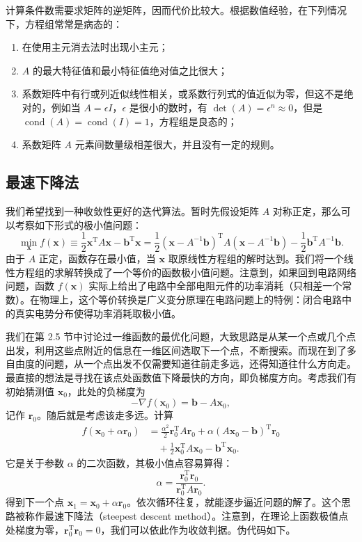 计算条件数需要求矩阵的逆矩阵，因而代价比较大。根据数值经验，在下列情况下，方程组常常是病态的：
\begin{enumerate}
\item 在使用主元消去法时出现小主元；
\item $A$ 的最大特征值和最小特征值绝对值之比很大；
\item 系数矩阵中有行或列近似线性相关，或系数行列式的值近似为零，但这不是绝对的，例如当 $A=\epsilon I$，$\epsilon$ 是很小的数时，有 $\det(A)=\epsilon^n\approx0$，但是 $\operatorname{cond}(A)=\operatorname{cond}(I)=1$，方程组是良态的；
\item 系数矩阵 $A$ 元素间数量级相差很大，并且没有一定的规则。
\end{enumerate}

\subsection{最速下降法}

我们希望找到一种收敛性更好的迭代算法。暂时先假设矩阵 $A$ 对称正定，那么可以考察如下形式的极小值问题：
\begin{equation}
\min_{\bm x} f(\bm x)\equiv\frac12\bm x^{\mathrm T}A\bm x-\bm b^{\mathrm T}\bm x
=\frac12(\bm x-A^{-1}\bm b)^{\mathrm T}A(\bm x-A^{-1}\bm b)-\frac12\bm b^{\mathrm T}A^{-1}\bm b.
\tag{3.2.16}
\end{equation}
由于 $A$ 正定，函数存在最小值，当 $\bm x$ 取原线性方程组的解时达到。我们将一个线性方程组的求解转换成了一个等价的函数极小值问题。注意到，如果回到电路网络问题，函数 $f(\bm x)$ 实际上给出了电路中全部电阻元件的功率消耗（只相差一个常数）。在物理上，这个等价转换是广义变分原理在电路问题上的特例：闭合电路中的真实电势分布使得功率消耗取极小值。

我们在第 2.5 节中讨论过一维函数的最优化问题，大致思路是从某一个点或几个点出发，利用这些点附近的信息在一维区间选取下一个点，不断搜索。而现在到了多自由度的问题，从一个点出发不仅需要知道往前走多远，还得知道往什么方向走。最直接的想法是寻找在该点处函数值下降最快的方向，即负梯度方向。考虑我们有初始猜测值 $\bm x_0$，此处的负梯度为
\begin{equation}
-\nabla f(\bm x_0)=\bm b-A\bm x_0,
\tag{3.2.17}
\end{equation}
记作 $\bm r_0$。随后就是考虑该走多远。计算
\begin{equation}
\begin{aligned}
f(\bm x_0+\alpha\bm r_0)
&=\frac{\alpha^2}{2}\bm r_0^{\mathrm T}A\bm r_0
+\alpha(A\bm x_0-\bm b)^{\mathrm T}\bm r_0\\
&\quad+\frac12\bm x_0^{\mathrm T}A\bm x_0-\bm b^{\mathrm T}\bm x_0.
\end{aligned}
\tag{3.2.18}
\end{equation}
它是关于参数 $\alpha$ 的二次函数，其极小值点容易算得：
\begin{equation}
\alpha=\frac{\bm r_0^{\mathrm T}\bm r_0}{\bm r_0^{\mathrm T}A\bm r_0}.
\tag{3.2.19}
\end{equation}
得到下一个点 $\bm x_1=\bm x_0+\alpha\bm r_0$。依次循环往复，就能逐步逼近问题的解了。这个思路被称作最速下降法（steepest descent method）。注意到，在理论上函数极值点处梯度为零，$\bm r_0^{\mathrm T}\bm r_0=0$，我们可以依此作为收敛判据。伪代码如下。

